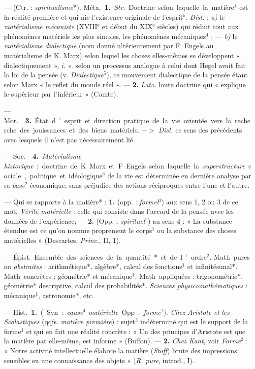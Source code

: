 \begin{itemize}[leftmargin=1cm, label=, itemsep=1pt]
 —  (Ctr. : {\it spiritualisme}*). \si{Méta.}
{\bf 1.} {\it Str.} Doctrine selon laquelle la matière$^4$ est la réalité
première et qui nie l'existence originale de l'esprit$^5$. {\it Dist.} :
{\it a)} le {\it matérialisme mécaniste} ({\footnotesize XVIII}$^\text{e}$ et
début du {\footnotesize XIX}$^\text{e}$ siècles) qui réduit tout aux
phénomènes matériels les plus simples, les phénomènes mécaniques$^4$ ; —
{\it b)} le {\it matérialisme dialectique} (nom donné ultérieurement par F.
Engels au matérialisme de K. Marx) selon lequel les choses elles-mêmes se
développent « dialectiquement », {\it i. e.} selon un processus analogue à
celui dont Hegel avait fait la loi de la pensée (v. {\it Dialectique}$^5$),
ce mouvement dialectique de la pensée étant selon Marx « le reflet du monde
réel ». — {\bf 2.} {\it Lato.} loute doctrine qui « explique le
supérieur par l’inférieur » (Comte).

— \si{Mor.}  {\bf 3.} État d'esprit et direction pratique de
la vie orientée vers la recherche des jouissances et des biens matériels. $->$
{\it Dist.} ce sens des précédents avec lesquels il n’est pas nécessairement
lié.

— \si{Soc.}  {\bf 4.} {\it Matérialisme historique} : doctrine
de K. Marx et F. Engels selon laquelle la {\it superstructure} sociale,
politique et idéologique$^3$ de la vie est déterminée en dernière analyse par
sa {\it base}$^2$ économique, sans préjudice des actions réciproques entre
l’une et l’autre.

 — Qui se rapporte à la matière* : {\bf 1.} (opp. :
{\it formel}$^3$) aux sens 1, 2 ou 3 de ce mot. {\it Vérité matérielle} :
celle qui consiste dans l’accord de la pensée avec les données de
l’expérience; — {\bf 2.} (Opp. : {\it spirituel}$^1$) au sens 4 : « La
substance étendue est ce qu’on nomme proprement le corps$^1$ ou la substance
des choses matérielles » (Descartes, {\it Princ.}, II, 1).

 — \si{Épist.} Ensemble des sciences de la quantité* et de
l’ordre$^2$. \si{Math. pures} ou {\it abstraites} : arithmétique*, algèbre*,
calcul des fonctions$^1$ et infinitésimal*. \si{Math. concrètes} : géométrie*
et mécanique$^1$. \si{Math. appliquées} : trigonométrie*, géométrie*
descriptive, calcul des probabilités*. {\it Sciences physicomathématiques} :
mécanique$^1$, astronomie*, etc.

 — \si{Hist.} {\bf 1.} (Syn. : {\it cause$^4$ matérielle}. Opp. :
{\it forme}$^1$). {\it Chez Aristote et les Scolastiques} (qqfs. {\it matière
première}) : sujet$^3$ indéterminé qui est le support de la forme$^1$ et qui
en fait une réalité concrète : « Un des principes d’Aristote est que la
matière par elle-même, est informe » (Buffon). — {\bf 2.} {\it Chez Kant},
voir {\it Forme}$^2$ :
« Notre activité intellectuelle élabore la matière ({\it Stoff}) brute des
impressions sensibles en une connaïssance des objets » ({\it R. pure},
introd., I).


\end{itemize}
